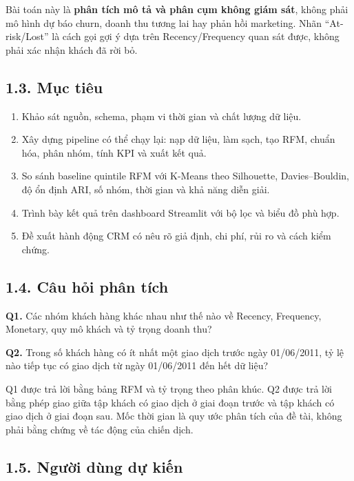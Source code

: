 \documentclass[a4paper]{article}
\begin{document}
Bài toán này là \textbf{phân tích mô tả và phân cụm không giám sát}, không phải mô hình dự báo churn, doanh thu tương lai hay phản hồi marketing. Nhãn “At-risk/Lost” là cách gọi gợi ý dựa trên Recency/Frequency quan sát được, không phải xác nhận khách đã rời bỏ.

\subsection*{1.3. Mục tiêu}

\begin{enumerate}
\item Khảo sát nguồn, schema, phạm vi thời gian và chất lượng dữ liệu.
\item Xây dựng pipeline có thể chạy lại: nạp dữ liệu, làm sạch, tạo RFM, chuẩn hóa, phân nhóm, tính KPI và xuất kết quả.
\item So sánh baseline quintile RFM với K-Means theo Silhouette, Davies--Bouldin, độ ổn định ARI, số nhóm, thời gian và khả năng diễn giải.
\item Trình bày kết quả trên dashboard Streamlit với bộ lọc và biểu đồ phù hợp.
\item Đề xuất hành động CRM có nêu rõ giả định, chi phí, rủi ro và cách kiểm chứng.
\end{enumerate}

\subsection*{1.4. Câu hỏi phân tích}

\textbf{Q1.} Các nhóm khách hàng khác nhau như thế nào về Recency, Frequency, Monetary, quy mô khách và tỷ trọng doanh thu?

\textbf{Q2.} Trong số khách hàng có ít nhất một giao dịch trước ngày 01/06/2011, tỷ lệ nào tiếp tục có giao dịch từ ngày 01/06/2011 đến hết dữ liệu?

Q1 được trả lời bằng bảng RFM và tỷ trọng theo phân khúc. Q2 được trả lời bằng phép giao giữa tập khách có giao dịch ở giai đoạn trước và tập khách có giao dịch ở giai đoạn sau. Mốc thời gian là quy ước phân tích của đề tài, không phải bằng chứng về tác động của chiến dịch.

\subsection*{1.5. Người dùng dự kiến}
\end{document}
